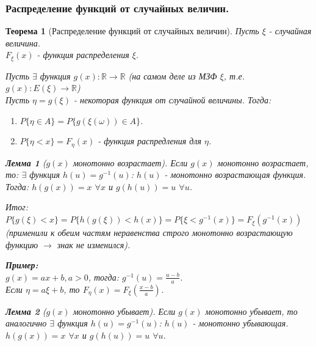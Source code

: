 \documentclass[14pt]{extarticle}
\theoremstyle{breakstyle}
\newtheorem{theorem}{Теорема}[subsection]
\newtheorem{lemma}{Лемма}[subsection]
\begin{document}
\subsubsection{Распределение функций от случайных величин.}
\begin{theorem}[Распределение функций от случайных величин]

Пусть $\xi$ - случайная величина.\\
$F_{\xi}(x)$ - функция распределения $\xi$.

\vspace{\baselineskip}

Пусть $\exists$ функция $g(x): \mathbb{R} \rightarrow \mathbb{R}$ (на самом деле из МЗФ $\xi$, т.е. $g(x): E(\xi) \rightarrow \mathbb{R}$)\\
Пусть $\eta = g(\xi)$ - некоторая функция от случайной величины. Тогда:
\begin{enumerate}
    \item $P\{\eta \in A\} = P\{g(\xi(\omega)) \in A\}$.
    \item $P\{\eta < x\} = F_{\eta}(x)$ - функция распредления для $\eta$.
\end{enumerate}

\begin{lemma}[$g(x)$ монотонно возрастает]

Если $g(x)$ монотонно возрастает, то: $\exists$ функция $h(u) = g^{-1}(u)$: $h(u)$ - монотонно возрастающая функция.\\
Тогда: $h(g(x)) = x$ $\forall x$ и $g(h(u)) = u$ $\forall u$.

\vspace{\baselineskip}

Итог: $P\{g(\xi) < x\} = P\{h(g(\xi)) < h(x)\} = P\{\xi < g^{-1}(x)\} = F_{\xi}(g^{-1}(x))$ (применили к обеим частям неравенства строго монотонно возрастающую функцию $\rightarrow$ знак не изменился).

\vspace{\baselineskip}

\textbf{Пример:}\\
$g(x) = ax+b, a>0$, тогда: $g^{-1}(u) = \frac{u - b}{a}$.\\
Если $\eta = a\xi + b$, то $F_{\eta}(x) = F_{\xi}(\frac{x-b}{a})$.

\end{lemma}

\begin{lemma}[$g(x)$ монотонно убывает]

Если $g(x)$ монотонно убывает, то аналогично $\exists$ функция $h(u)=g^{-1}(u)$: $h(u)$ - монотонно убывающая.\\
$h(g(x)) = x$ $\forall x$ и $g(h(u)) = u$ $\forall u$.


\end{lemma}
\end{theorem}
\end{document}
